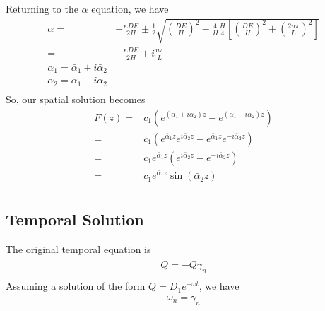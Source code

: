 \documentclass[11pt]{article}
\newcommand{\ABA}{\bar{\alpha}_1}
\newcommand{\ABB}{\bar{\alpha}_2}
\begin{document}
Returning to the $\alpha$ equation, we have
\begin{equation}\begin{aligned}
	\alpha = & -\frac{\kappa DE}{2H} \pm \frac{1}{2} \sqrt{\left(\frac{DE}{H}\right)^2 - \frac{4}{H} \frac{H}{4} \left[ \left(\frac{DE}{H}\right)^2 + \left( \frac{2n\pi}{L} \right)^2  \right]} \\
	       = & -\frac{\kappa DE}{2H} \pm i \frac{n\pi}{L} \\
	\alpha_1 = \ABA + i \ABB \\
	\alpha_2 = \ABA - i \ABB \\
\end{aligned} \end{equation}
So, our spatial solution becomes
\begin{equation}\begin{aligned}
	F(z) = & c_1 (e^{(\ABA + i \ABB) z} - e^{(\ABA - i \ABB) z}) \\
	     = & c_1 (e^{\ABA z}e^{i \ABB z} - e^{\ABA z}e^{-i \ABB z}) \\
	     = & c_1 e^{\ABA z} (e^{i \ABB z} - e^{-i \ABB z}) \\
	     = & c_1 e^{\ABA z} \sin(\ABB z) \\
\end{aligned} \end{equation}

\subsection{Temporal Solution}
The original temporal equation is
\begin{equation}\begin{aligned}
\dot{Q} = -Q \gamma_n \\
\end{aligned} \end{equation}
Assuming a solution of the form $Q = D_1 e^{-\omega t}$, we have
\begin{equation}\begin{aligned}
\omega_n = \gamma_n \\
\end{aligned} \end{equation}
\end{document}
